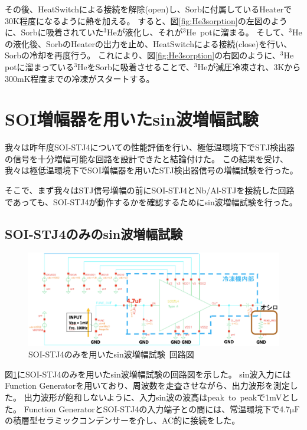 				その後、HeatSwitchによる接続を解除(open)し、Sorbに付属しているHeaterで30K程度になるように熱を加える。
				すると、図\ref{fig:He3sorption}の左図のように、Sorbに吸着されていた$\mathrm{^{3}He}$が液化し、それが$\mathrm{^{3}He}$\ potに溜まる。
				そして、$\mathrm{^{3}He}$の液化後、SorbのHeaterの出力を止め、HeatSwitchによる接続(close)を行い、Sorbの冷却を再度行う。
				これにより、図\ref{fig:He3sorption}の右図のように、$\mathrm{^{3}He}$ potに溜まっている$\mathrm{^{3}He}$をSorbに吸着させることで、$\mathrm{^{3}He}$が減圧冷凍され、3Kから300mK程度までの冷凍がスタートする。
				\clearpage
	
	\section{SOI増幅器を用いたsin波増幅試験}
		我々は昨年度SOI-STJ4についての性能評価を行い、極低温環境下でSTJ検出器の信号を十分増幅可能な回路を設計できたと結論付けた。
		この結果を受け、我々は極低温環境下でSOI増幅器を用いたSTJ検出器信号の増幅試験を行った。
		
		そこで、まず我々はSTJ信号増幅の前にSOI-STJ4とNb/Al-STJを接続した回路であっても、SOI-STJ4が動作するかを確認するためにsin波増幅試験を行った。
		\subsection{SOI-STJ4のみのsin波増幅試験}
			\begin{figure}[htbp]
				\begin{center}
					\includegraphics[width=12.0cm]{./Chapter/Chapter4/Picture/SOISTJ4woSTJ_amp_sin.eps}
					\caption{SOI-STJ4のみを用いたsin波増幅試験\ 回路図}
					\label{fig:SOISTJ4woSTJ_amp_sin}
				\end{center}
			\end{figure}
			図\ref{fig:SOISTJ4woSTJ_amp_sin}にSOI-STJ4のみを用いたsin波増幅試験の回路図を示した。
			sin波入力にはFunction Generatorを用いており、周波数を走査させながら、出力波形を測定した。
			出力波形が飽和しないように、入力sin波の波高はpeak\ to\ peakで1mVとした。
			Function GeneratorとSOI-STJ4の入力端子との間には、常温環境下で4.7$\mathrm{\mu F}$の積層型セラミックコンデンサーを介し、AC的に接続をした。
			
